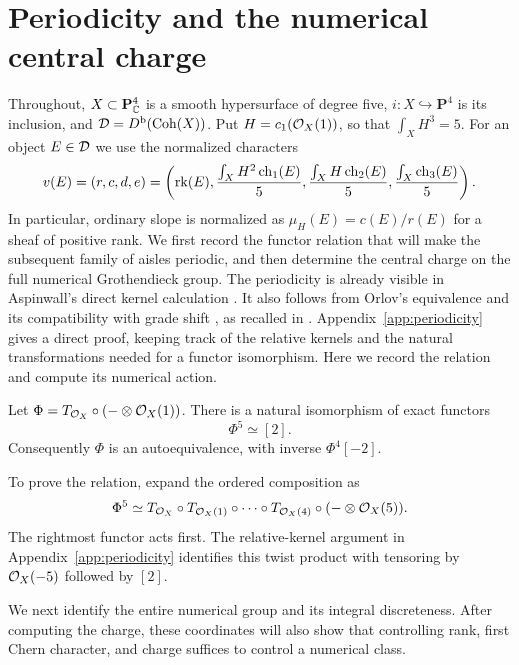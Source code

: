 \section{Periodicity and the numerical central charge}
\label{sec:numerical}

Throughout, $X\subset\mathbf P^4_{\mathbb C}$ is a smooth hypersurface of degree
five, $i\colon X\hookrightarrow\mathbf P^4$ is its inclusion, and
$\mathcal D=D^{\mathrm b}(\operatorname{Coh}(X))$. Put $H=c_1(\mathcal O_X(1))$, so that $\int_XH^3=5$.
For an object $E\in\mathcal D$ we use the normalized characters
\begin{equation}
\label{eq:normalized-characters}
 v(E)=(r,c,d,e)
 =\left(\operatorname{rk}(E),\frac{\int_XH^2\operatorname{ch}_1(E)}5,
                  \frac{\int_XH\operatorname{ch}_2(E)}5,
                  \frac{\int_X\operatorname{ch}_3(E)}5\right).
\end{equation}
In particular, ordinary slope is normalized as $\mu_H(E)=c(E)/r(E)$
for a sheaf of positive rank. We first record the functor relation that
will make the subsequent family of aisles periodic, and then determine
the central charge on the full numerical Grothendieck group.
The periodicity is already visible in Aspinwall's direct kernel calculation
\cite[Section~7.1.4]{Aspinwall2004}. It also follows from Orlov's equivalence
\cite[Theorem~2.5]{Orlov2009} and its compatibility with grade shift
\cite[Proposition~5.8 and Remark~5.12]{BallardFaveroKatzarkov2012},
as recalled in \cite[Theorem~2.5]{TodaQuintic2013}.
Appendix~\ref{app:periodicity} gives a direct proof, keeping track of the
relative kernels and the natural transformations needed for a functor
isomorphism.  Here we record the relation and compute its numerical action.

\begin{lemma}\label{lem:periodicity}
Let $\Phi=T_{\mathcal O_X}\circ(-\otimes\mathcal O_X(1))$. There is a natural
isomorphism of exact functors
\begin{equation}\label{eq:periodicity}
 \Phi^5\simeq[2].
\end{equation}
Consequently $\Phi$ is an autoequivalence, with inverse $\Phi^4[-2]$.
\end{lemma}

To prove the relation, expand the ordered composition as
\[
 \Phi^5\simeq
 T_{\mathcal O_X}\circ T_{\mathcal O_X(1)}\circ\cdots\circ T_{\mathcal O_X(4)}
 \circ(-\otimes\mathcal O_X(5)).
\]
The rightmost functor acts first.  The relative-kernel argument in
Appendix~\ref{app:periodicity} identifies this twist product with
tensoring by $\mathcal O_X(-5)$ followed by $[2]$.

We next identify the entire numerical group and its integral discreteness.
After computing the charge, these coordinates will also show that controlling
rank, first Chern character, and charge suffices to control a numerical class.

